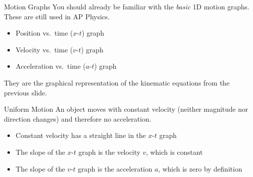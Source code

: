 \documentclass[12pt,compress,aspectratio=169]{beamer}
\begin{document}
\begin{frame}{Motion Graphs}
  You should already be familiar with the \emph{basic} 1D motion graphs.
  These are still used in AP Physics.
  \begin{itemize}
  \item Position vs.\ time ($x$-$t$) graph
  \item Velocity vs.\ time ($v$-$t$) graph
  \item Acceleration vs.\ time ($a$-$t$) graph
  \end{itemize}
  They are the graphical representation of the kinematic equations from the
  previous slide.
\end{frame}



\begin{frame}{Uniform Motion}
  An object moves with constant velocity
  (neither magnitude nor direction changes) and therefore no acceleration.
  \begin{center}
    \hspace{.15in}
    \hspace{.15in}
  \end{center}
  \begin{itemize}
  \item Constant velocity has a straight line in the $x$-$t$ graph
  \item The slope of the $x$-$t$ graph is the velocity $v$, which is constant
  \item The slope of the $v$-$t$ graph is the acceleration $a$, which is zero by
    definition
  \end{itemize}
\end{frame}
\end{document}
